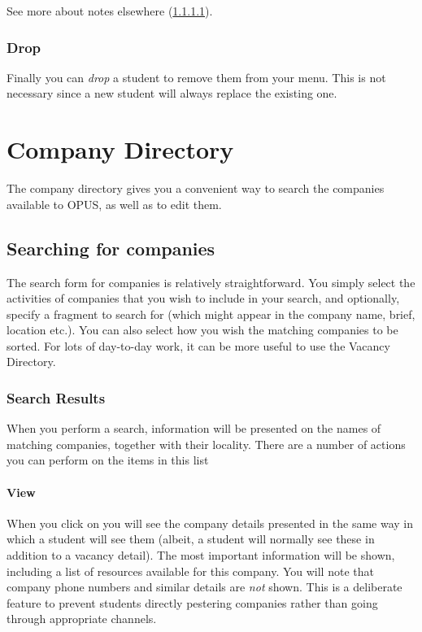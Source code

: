 \documentclass[12 pt]{book}
\begin{document}
See more about notes elsewhere (\ref{}).

\subsection{Drop}

Finally you can \emph{drop} a student to remove them from your menu. This is
not necessary since a new student will always replace the existing one.

%
%
%

\chapter{Company Directory}

The company directory gives you a convenient way to search the companies
available to OPUS, as well as to edit them.

\section{Searching for companies}

The search form for companies is relatively straightforward. You simply select
the activities of companies that you wish to include in your search, and
optionally, specify a fragment to search for (which might appear in the
company name, brief, location etc.). You can also select how you wish the
matching companies to be sorted. For lots of day-to-day work, it can be
more useful to use the Vacancy Directory.

\subsection{Search Results}

When you perform a search, information will be presented on the names of
matching companies, together with their locality. There are a number of 
actions you can perform on the items in this list

\subsubsection{View}

When you click on  you will see the company details presented
in the same way in which a student will see them (albeit, a student will
normally see these in addition to a vacancy detail). The most important
information will be shown, including a list of resources available for this
company. You will note that company phone numbers and similar details are
\emph{not} shown. This is a deliberate feature to prevent students directly
pestering companies rather than going through appropriate channels.
\end{document}
